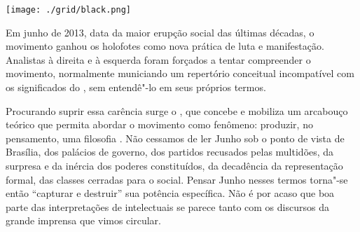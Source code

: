 \vfill

\hspace*{-.4cm}\begin{minipage}[c]{.5\linewidth}
\small{
{}}
\end{minipage}

\pagebreak %

\begin{center}
\hspace*{-3.6cm}
\hspace*{3.1cm}\texttt{[image: ./grid/black.png]}
\end{center}

\hspace*{-7cm}\hrulefill\hspace*{-7cm}

\medskip

\noindent{}Em junho de 2013, data da maior erupção social das últimas décadas, o movimento {} ganhou os holofotes como nova prática de luta e manifestação. Analistas à direita e à esquerda foram forçados a tentar compreender o movimento, normalmente municiando um repertório conceitual incompatível com os significados do {}, sem entendê"-lo em seus próprios termos.

Procurando suprir essa carência surge o {}, que concebe e mobiliza um arcabouço teórico que permita abordar o movimento {} como fenômeno: produzir, no pensamento, uma filosofia {}. Não cessamos de ler Junho sob o ponto de vista de Brasília, dos palácios de governo, dos partidos recusados pelas multidões, da surpresa e da inércia dos poderes constituídos, da decadência da representação formal, das classes cerradas para o social. Pensar Junho nesses termos torna"-se então “capturar e destruir” sua potência específica. Não é por acaso que boa parte das interpretações de intelectuais se parece tanto com os discursos da grande imprensa que vimos circular.


